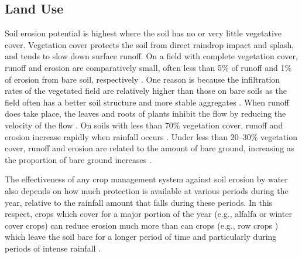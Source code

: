 \subsection{Land Use}
\label{sec:LandUse}

Soil erosion potential is highest where the soil has no or very little
vegetative cover. Vegetation cover protects the soil from direct raindrop impact
and splash, and tends to slow down surface runoff. On a field with complete
vegetation cover, runoff and erosion are comparatively small, often less than
5\% of runoff and 1\% of erosion from bare soil, respectively
\citep{braskerud2001-1447,rey2003-549}. One reason is because the infiltration
rates of the vegetated field are relatively higher than those on bare soils as
the field often has a better soil structure and more stable aggregates
\citep{robinson2001-1}. When runoff does take place, the leaves and roots of
plants inhibit the flow by reducing the velocity of the flow
\citep{braskerud2001-1447,rey2003-549}. On soils with less than 70\% vegetation
cover, runoff and erosion increase rapidly when rainfall occurs
\citep{favis1996-529}. Under less than 20--30\% vegetation cover, runoff and
erosion are related to the amount of bare ground, increasing as the proportion
of bare ground increases \citep{favis1996-529}.

The effectiveness of any crop management system against soil erosion by water
also depends on how much protection is available at various periods during the
year, relative to the rainfall amount that falls during these periods. In this
respect, crops which cover for a major portion of the year (e.g., alfalfa or
winter cover crops) can reduce erosion much more than can crops (e.g., row crops
) which leave the soil bare for a longer period of time and particularly during
periods of intense rainfall \citep{zhang1995-1069,zhang1995-1079}.

%
%
